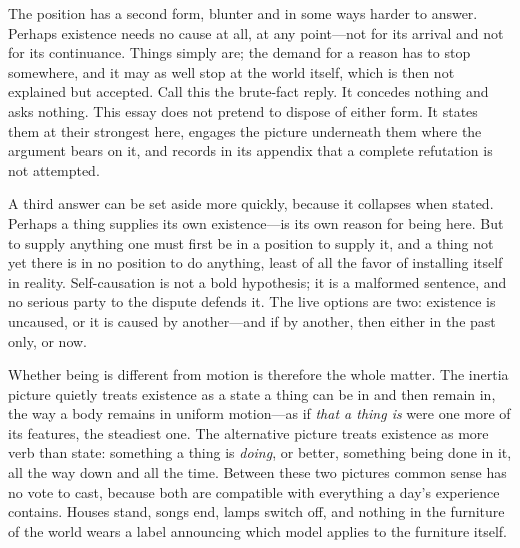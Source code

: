 The position has a second form, blunter and in some ways harder to answer. Perhaps existence needs no cause at all, at any point---not for its arrival and not for its continuance. Things simply are; the demand for a reason has to stop somewhere, and it may as well stop at the world itself, which is then not explained but accepted. Call this the brute-fact reply. It concedes nothing and asks nothing. This essay does not pretend to dispose of either form. It states them at their strongest here, engages the picture underneath them where the argument bears on it, and records in its appendix that a complete refutation is not attempted.

A third answer can be set aside more quickly, because it collapses when stated. Perhaps a thing supplies its own existence---is its own reason for being here. But to supply anything one must first be in a position to supply it, and a thing not yet there is in no position to do anything, least of all the favor of installing itself in reality. Self-causation is not a bold hypothesis; it is a malformed sentence, and no serious party to the dispute defends it. The live options are two: existence is uncaused, or it is caused by another---and if by another, then either in the past only, or now.

Whether being is different from motion is therefore the whole matter. The inertia picture quietly treats existence as a state a thing can be in and then remain in, the way a body remains in uniform motion---as if \emph{that a thing is} were one more of its features, the steadiest one. The alternative picture treats existence as more verb than state: something a thing is \emph{doing}, or better, something being done in it, all the way down and all the time. Between these two pictures common sense has no vote to cast, because both are compatible with everything a day's experience contains. Houses stand, songs end, lamps switch off, and nothing in the furniture of the world wears a label announcing which model applies to the furniture itself.

